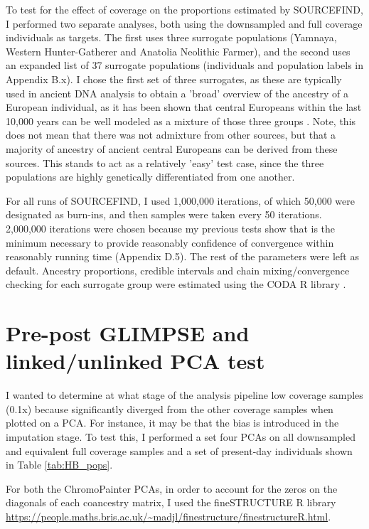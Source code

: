 To test for the effect of coverage on the proportions estimated by SOURCEFIND, I performed two separate analyses, both using the downsampled and full coverage individuals as targets. The first uses three surrogate populations (Yamnaya, Western Hunter-Gatherer and Anatolia Neolithic Farmer), and the second uses an expanded list of 37 surrogate populations (individuals and population labels in Appendix B.x). I chose the first set of three surrogates, as these are typically used in ancient DNA analysis to obtain a 'broad' overview of the ancestry of a European individual, as it has been shown that central Europeans within the last 10,000 years can be well modeled as a mixture of those three groups \cite{Lazaridis2014, Haak2015}. Note, this does not mean that there was not admixture from other sources, but that a majority of ancestry of ancient central Europeans can be derived from these sources. This stands to act as a relatively 'easy' test case, since the three populations are highly genetically differentiated from one another.

For all runs of SOURCEFIND, I used 1,000,000 iterations, of which 50,000 were designated as burn-ins, and then samples were taken every 50 iterations. 2,000,000 iterations were chosen because my previous tests show that is the minimum necessary to provide reasonably confidence of convergence within reasonably running time (Appendix D.5). The rest of the parameters were left as default. Ancestry proportions, credible intervals and chain mixing/convergence checking for each surrogate group were estimated using the CODA R library \cite{oro22547}.

\section{Pre-post GLIMPSE and linked/unlinked PCA test}

I wanted to determine at what stage of the analysis pipeline low coverage samples (0.1x) because significantly diverged from the other coverage samples when plotted on a PCA. For instance, it may be that the bias is introduced in the imputation stage. To test this, I performed a set four PCAs on all downsampled and equivalent full coverage samples and a set of present-day individuals shown in Table \ref{tab:HB_pops}.

For both the ChromoPainter PCAs, in order to account for the zeros on the diagonals of each coancestry matrix, I used the fineSTRUCTURE R library \url{https://people.maths.bris.ac.uk/~madjl/finestructure/finestructureR.html}.

